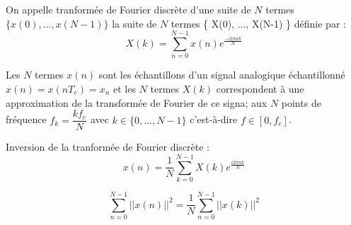 \documentclass[a4paper,12pt]{report}
\begin{document}
\begin{defi}
    On appelle tranformée de Fourier discrète d'une suite de $N$ termes $\{ x(0), ..., x(N-1) \}$ la suite de $N$ termes \{ X(0), ..., X(N-1) \} définie par :
    \[ X(k) = \sum_{n=0}^{N-1} x(n) e^{\frac{-i2\pi nk}{N}} \]

    Les $N$ termes $x(n)$ sont les échantillons d'un signal analogique échantillonné $x(n) = x(nT_e) = x_n$ et les $N$ termes $X(k)$ correspondent à une approximation de la transformée de Fourier de ce signa; aux $N$ points de fréquence $f_k = \dfrac{kf_e}{N}$ avec $k \in \{ 0, ..., N-1 \}$ c'est-à-dire $f \in [0, f_e]$.

    Inversion de la tranformée de Fourier discrète :
    \[ x(n) = \dfrac{1}{N} \sum_{k=0}^{N-1}X(k) e^{\frac{i2\pi nk}{N}} \]
\end{defi}

\begin{defi}
    \[ \sum_{n=0}^{N-1} ||x(n)||^2 = \dfrac{1}{N} \sum_{n=0}^{N-1} ||x(k)||^2 \]
\end{defi}
\end{document}
